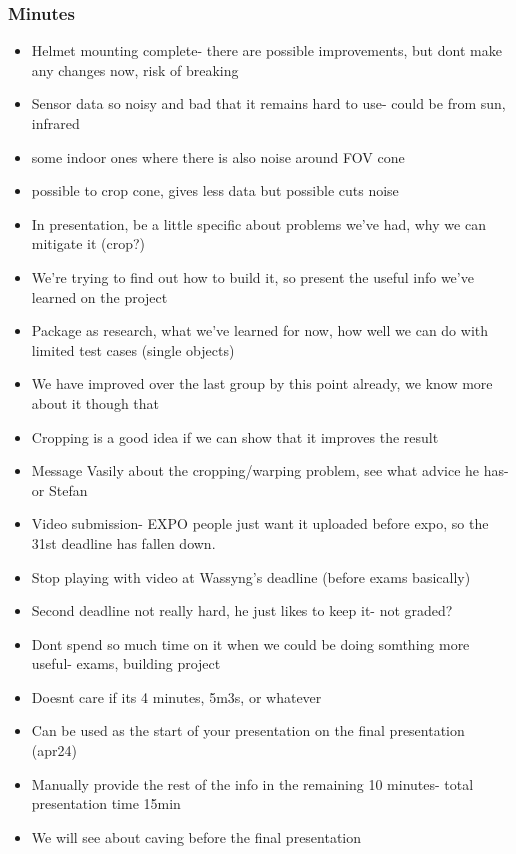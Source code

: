 		\subsubsection*{Minutes}
			\begin{itemize}
				\item Helmet mounting complete- there are possible improvements, but dont make any changes now, risk of breaking
				\item Sensor data so noisy and bad that it remains hard to use- could be from sun, infrared
				\item some indoor ones where there is also noise around FOV cone
				\item possible to crop cone, gives less data but possible cuts noise
				\item In presentation, be a little specific about problems we've had, why we can mitigate it (crop?)
				\item We're trying to find out how to build it, so present the useful info we've learned on the project
				\item Package as research, what we've learned for now, how well we can do with limited test cases (single objects)
				\item We have improved over the last group by this point already, we know more about it though that
				\item Cropping is a good idea if we can show that it improves the result
				\item Message Vasily about the cropping/warping problem, see what advice he has- or Stefan
				\item Video submission- EXPO people just want it uploaded before expo, so the 31st deadline has fallen down. 
				\item Stop playing with video at Wassyng's deadline (before exams basically)
				\item Second deadline not really hard, he just likes to keep it- not graded? 
				\item Dont spend so much time on it when we could be doing somthing more useful- exams, building project
				\item Doesnt care if its 4 minutes, 5m3s, or whatever
				\item Can be used as the start of your presentation on the final presentation (apr24)
				\item Manually provide the rest of the info in the remaining 10 minutes- total presentation time 15min
				\item We will see about caving before the final presentation

\end{itemize}
